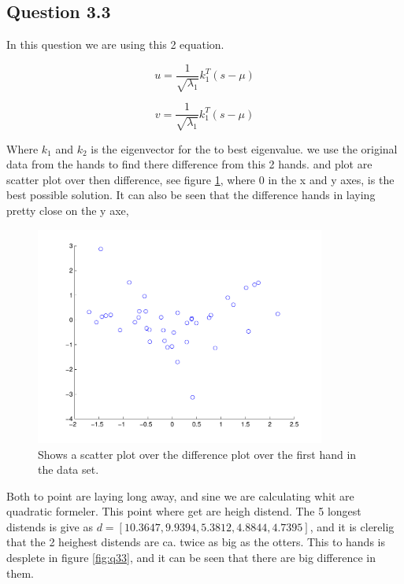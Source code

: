 \subsection*{Question 3.3}
In this question we are using this 2 equation.

\begin{equation}
	u = \frac{1}{\sqrt{\lambda_1}}k^T_1(s-\mu)
\end{equation}

\begin{equation}
	v = \frac{1}{\sqrt{\lambda_1}}k^T_1(s-\mu)
\end{equation}

Where $k_1$ and $k_2$ is the eigenvector for the to best eigenvalue. we use the original data from the hands to find there difference from this 2 hands. and plot are scatter plot over then difference, see figure \ref{fig:q33scatter}, where 0 in the x and y axes, is the best possible solution. It can also be seen that the difference hands in laying pretty close on the y axe, 

\begin{figure}[!htbp]
  \centering
  \includegraphics[width=0.85\textwidth]{./images/q33_scatter}
  \caption{Shows a scatter plot over the difference  plot over the first hand in the data set.}
  \label{fig:q33scatter}
\end{figure}

Both to point are laying long away, and sine we are calculating whit are quadratic formeler. This point where get are heigh distend. The 5 longest distends is give as $d = [10.3647, 9.9394,5.3812, 4.8844, 4.7395]$, and it is clerelig that the 2 heighest distends are ca. twice as big as the otters.
This to hands is desplete in figure \ref{fig:q33}, and it can be seen that there are big difference in them.


